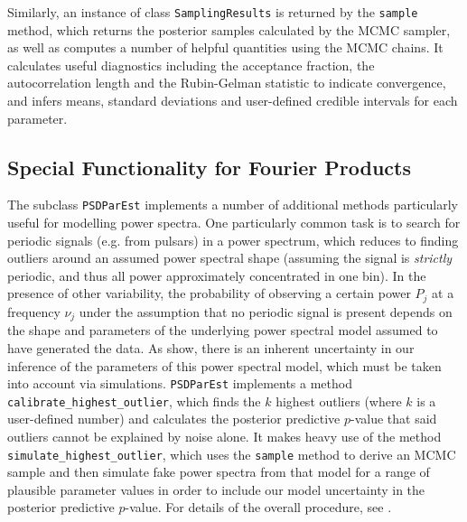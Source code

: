 \documentclass[twocolumn]{aastex62}
\begin{document}

Similarly, an instance of class \verb|SamplingResults| is returned by the \verb|sample| method, which returns the posterior samples calculated by the MCMC sampler, as well as computes a number of helpful quantities using the MCMC chains. It calculates useful diagnostics including the acceptance fraction, the autocorrelation length and the Rubin-Gelman statistic \citep{gelman1992} to indicate convergence, and infers means, standard deviations and user-defined credible intervals for each parameter.


\subsection{Special Functionality for Fourier Products}

The subclass \verb|PSDParEst| implements a number of additional methods particularly useful for modelling power spectra. One particularly common task is to search for periodic signals (e.g. from pulsars) in a power spectrum, which reduces to finding outliers around an assumed power spectral shape (assuming the signal is \textit{strictly} periodic, and thus all power approximately concentrated in one bin). In the presence of other variability, the probability of observing a certain power $P_j$ at a frequency $\nu_j$ under the assumption that no periodic signal is present depends on the shape and parameters of the underlying power spectral model assumed to have generated the data. As \citet{vaughan2010} show, there is an inherent uncertainty in our inference of the parameters of this power spectral model, which must be taken into account via simulations. \verb|PSDParEst| implements a method \verb|calibrate_highest_outlier|, which finds the $k$ highest outliers (where $k$ is a user-defined number) and calculates the posterior predictive $p$-value that said outliers cannot be explained by noise alone. It makes heavy use of the method \verb|simulate_highest_outlier|, which uses the \verb|sample| method to derive an MCMC sample and then simulate fake power spectra from that model for a range of plausible parameter values in order to include our model uncertainty in the posterior predictive $p$-value. For details of the overall procedure, see \citet{vaughan2010}. 
\end{document}
